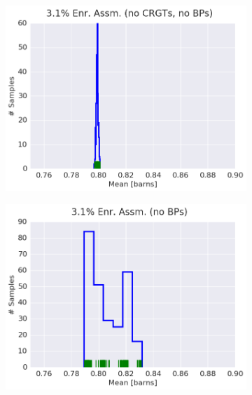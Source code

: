 \begin{figure}[h!]
\centering
\begin{subfigure}{0.5\textwidth}
  \centering
  \includegraphics[width=\linewidth]{figures/patterns/assm-3.1-inf/hist-kde-rug/assm-31-inf-capt-1}
  \caption{}
  \label{fig:chap9-hist-assm-3.1-inf-capt}
\end{subfigure}%
\begin{subfigure}{0.5\textwidth}
  \centering
  \includegraphics[width=\linewidth]{figures/patterns/assm-3.1/hist-kde-rug/assm-31-capt-1}
  \caption{}
  \label{fig:chap9-hist-assm-3.1-capt}
\end{subfigure}
\begin{subfigure}{0.5\textwidth}

\end{subfigure}
\end{figure}
